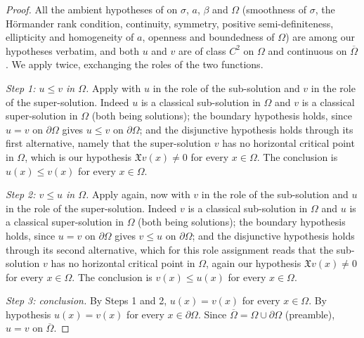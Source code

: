 \begin{proof}
All the ambient hypotheses of  on $\sigma$, $a$, $\beta$ and $\Omega$
(smoothness of $\sigma$, the H\"ormander rank condition, continuity, symmetry, positive
semi-definiteness, ellipticity and homogeneity of $a$, openness and boundedness of $\Omega$) are
among our hypotheses verbatim, and both $u$ and $v$ are of class $C^2$ on $\Omega$ and continuous
on $\overline\Omega$. We apply  twice, exchanging the roles of the two
functions.

\emph{Step 1: $u\leq v$ in $\Omega$.} Apply  with $u$ in the role of
the sub-solution and $v$ in the role of the super-solution. Indeed $u$ is a classical sub-solution
in $\Omega$ and $v$ is a classical super-solution in $\Omega$ (both being solutions); the boundary
hypothesis holds, since $u=v$ on $\partial\Omega$ gives $u\leq v$ on $\partial\Omega$; and the
disjunctive hypothesis holds through its first alternative, namely that the super-solution $v$ has
no horizontal critical point in $\Omega$, which is our hypothesis $\mathfrak{X}v(x)\neq0$ for every
$x\in\Omega$. The conclusion is $u(x)\leq v(x)$ for every $x\in\Omega$.

\emph{Step 2: $v\leq u$ in $\Omega$.} Apply  again, now with $v$ in
the role of the sub-solution and $u$ in the role of the super-solution. Indeed $v$ is a classical
sub-solution in $\Omega$ and $u$ is a classical super-solution in $\Omega$ (both being solutions);
the boundary hypothesis holds, since $u=v$ on $\partial\Omega$ gives $v\leq u$ on $\partial\Omega$;
and the disjunctive hypothesis holds through its second alternative, which for this role assignment
reads that the sub-solution $v$ has no horizontal critical point in $\Omega$, again our hypothesis
$\mathfrak{X}v(x)\neq0$ for every $x\in\Omega$. The conclusion is $v(x)\leq u(x)$ for every
$x\in\Omega$.

\emph{Step 3: conclusion.} By Steps 1 and 2, $u(x)=v(x)$ for every $x\in\Omega$. By hypothesis
$u(x)=v(x)$ for every $x\in\partial\Omega$. Since
$\overline\Omega=\Omega\cup\partial\Omega$ (preamble), $u=v$ on $\overline\Omega$.
\end{proof}
